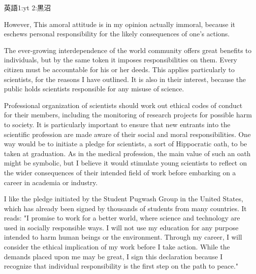 \documentclass[fleqn]{jbook}
\begin{document}
\begin{question}{英語}{1:yt 2:黒沼}
\begin{subquestions}
However,
This amoral attitude is in my opinion actually immoral, because 
it eschews personal responsibility for the likely consequences of
one's actions.

The ever-growing interdependence of the world
community offers great benefits to individuals,
but by the same token it imposes responsibilities
on them. Every citizen must be accountable for his or
her deeds. This applies particularly to scientists,
for the reasons I have outlined. It is also in their
interest, because the public holds scientists responsible
for any misuse of science. 

Professional organization of scientists should work
out ethical codes of conduct for their members, including 
the monitoring of research projects for possible harm to
society. It is particularly important to ensure that new
entrants into the scientific profession are made aware
of their social and moral responsibilities. One way 
would be to initiate a pledge for scientists, a sort of
Hippocratic oath, to be taken at graduation. As in the
medical profession, the main value of such an oath might be 
symbolic, but I believe it would stimulate young scientists 
to reflect on the wider consequences of their intended field 
of work before embarking on a career in academia or industry.

I like the pledge initiated by the Student Pugwash Group
in the United States, which has already been signed by
thousands of students from many countries. It reads:
"I promise to work for a better world, where science and
technology are used in socially responsible ways. I will
not use my education for any purpose intended to harm 
human beings or the environment. Through my career, I 
will consider the ethical implication of my work before 
I take action. While the demands placed upon me may be great,
I sign this declaration because I recognize that individual 
responsibility is the first step on the path to peace."


\end{subquestions}
\end{question}
\end{document}
